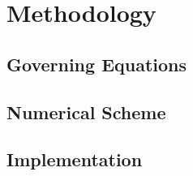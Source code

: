 \chapter{Methodology}
\label{ch:methodology}

\lipsum[2]

\section{Governing Equations}
\label{sec:governing-equations}


\section{Numerical Scheme}
\label{sec:numerical-scheme}


\section{Implementation}
\label{sec:implementation}

